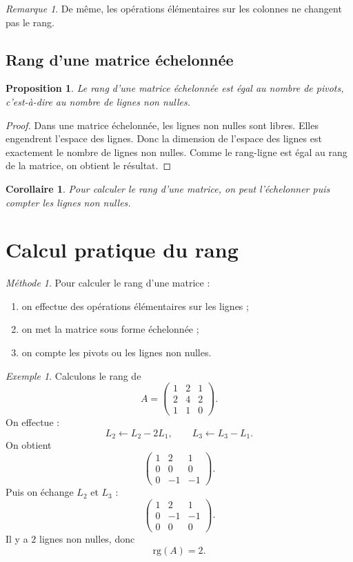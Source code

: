 \documentclass[11pt,a4paper]{article}
\newtheorem{proposition}[definition]{Proposition}
\newtheorem{corollaire}[definition]{Corollaire}
\theoremstyle{remark}
\newtheorem{remarque}[definition]{Remarque}
\newtheorem{exemple}[definition]{Exemple}
\newtheorem*{methode}{Méthode}
\newcommand{\rg}{\mathrm{rg}}
\begin{document}
\begin{remarque}
De même, les opérations élémentaires sur les colonnes ne changent pas le rang.
\end{remarque}

\subsection{Rang d’une matrice échelonnée}

\begin{proposition}
Le rang d’une matrice échelonnée est égal au nombre de pivots, c’est-à-dire au nombre de lignes non nulles.
\end{proposition}

\begin{proof}
Dans une matrice échelonnée, les lignes non nulles sont libres. Elles engendrent l’espace des lignes. Donc la dimension de l’espace des lignes est exactement le nombre de lignes non nulles. Comme le rang-ligne est égal au rang de la matrice, on obtient le résultat.
\end{proof}

\begin{corollaire}
Pour calculer le rang d’une matrice, on peut l’échelonner puis compter les lignes non nulles.
\end{corollaire}

\section{Calcul pratique du rang}

\begin{methode}
Pour calculer le rang d’une matrice :
\begin{enumerate}
    \item on effectue des opérations élémentaires sur les lignes ;
    \item on met la matrice sous forme échelonnée ;
    \item on compte les pivots ou les lignes non nulles.
\end{enumerate}
\end{methode}

\begin{exemple}
Calculons le rang de
\[
A=
\begin{pmatrix}
1 & 2 & 1\\
2 & 4 & 2\\
1 & 1 & 0
\end{pmatrix}.
\]
On effectue :
\[
L_2\leftarrow L_2-2L_1,
\qquad
L_3\leftarrow L_3-L_1.
\]
On obtient
\[
\begin{pmatrix}
1 & 2 & 1\\
0 & 0 & 0\\
0 & -1 & -1
\end{pmatrix}.
\]
Puis on échange \(L_2\) et \(L_3\) :
\[
\begin{pmatrix}
1 & 2 & 1\\
0 & -1 & -1\\
0 & 0 & 0
\end{pmatrix}.
\]
Il y a \(2\) lignes non nulles, donc
\[
\rg(A)=2.
\]
\end{exemple}
\end{document}
